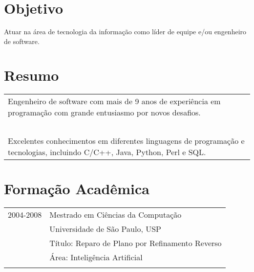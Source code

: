 \documentclass[a4paper, oneside, final]{scrartcl}
\begin{document}
\begin{center}
\textsc{\Huge{}}\\
\ \\

\section{Objetivo}
Atuar na área de tecnologia da informação como líder de equipe e/ou engenheiro de software.

%

\section{Resumo}

\begin{tabularx}{0.97\linewidth}{X}
  Engenheiro de software com mais de 9 anos de experiência em programação com grande entusiasmo por novos desafios. \\ \ \\
  Excelentes conhecimentos em diferentes linguagens de programação e tecnologias, incluindo C/C++, Java, Python, Perl e SQL.
\end{tabularx}

\section{Formação Acadêmica}

\begin{tabularx}{0.97\linewidth}{p{2cm}X}
2004-2008   & Mestrado em Ciências da Computação\\
            & Universidade de São Paulo, USP\\
            & Título: Reparo de Plano por Refinamento Reverso\\
            & Área:  Inteligência Artificial\\ \\


\end{tabularx}
\end{center}
\end{document}
